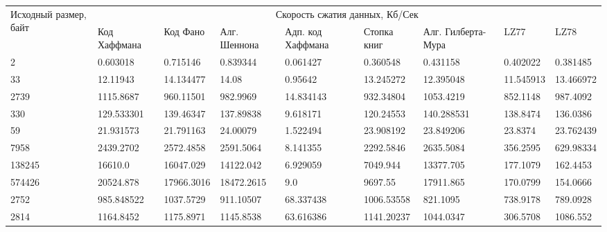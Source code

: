 \documentclass[a4paper,oneside]{article}
\theoremstyle{definition}
\begin{document}
\begin{table}[H]
  \small
  \centering
  \begin{tabular}{|p{1.5cm}|p{1.5cm}|p{1.5cm}|p{1.5cm}|p{1.5cm}|p{1.5cm}|p{1.5cm}|p{1.5cm}|p{1.5cm}|}
    \hline
    \multirow{2}{1.5cm}{Исходный размер, байт} & \multicolumn{8}{c|}{Скорость сжатия данных, Кб/Сек} \\ \cline{2-9}
    & Код Хаффмана & Код Фано & Алг. Шеннона & Адп. код Хаффмана &
    Стопка книг & Алг. Гилберта-Мура & LZ77 & LZ78 \\ \hline \hline

    2      & 0.603018 & 0.715146 & 0.839344 & 0.061427 & 0.360548 & 0.431158 & 0.402022 & 0.381485 \\ \hline
    33     & 12.11943 & 14.134477 & 14.08 & 0.95642 & 13.245272 & 12.395048 & 11.545913 & 13.466972 \\ \hline
    2739   & 1115.8687 & 960.11501 & 982.9969 & 14.834143 & 932.34804 & 1053.4219 & 852.1148 & 987.4092 \\ \hline
    330    & 129.533301 & 139.46347 & 137.89838 & 9.618171 & 120.24553 & 140.288531 & 138.8474 & 136.0386 \\ \hline
    59     & 21.931573 & 21.791163 & 24.00079 & 1.522494 & 23.908192 & 23.849206 & 23.8374 & 23.762439 \\ \hline
    7958   & 2439.2702 & 2572.4858 & 2591.5064 & 8.141355 & 2292.5846 & 2635.5084 & 356.2595 & 629.98334 \\ \hline
    138245 & 16610.0 & 16047.029 & 14122.042 & 6.929059 & 7049.944 & 13377.705 & 177.1079 & 162.4453 \\ \hline
    574426 & 20524.878 & 17966.3016 & 18472.2615 & 9.0 & 9697.55 & 17911.865 & 170.0799 & 154.0666 \\ \hline
    2752   & 985.848522 & 1037.5729 & 911.10507 & 68.337438 & 1006.53558 & 821.1095 & 738.9178 & 789.0928 \\ \hline
    2814   & 1164.8452 & 1175.8971 & 1145.8538 & 63.616386 & 1141.20237 & 1044.0347 & 306.5708 & 1086.552 \\ \hline
  \end{tabular}
\end{table}
\end{document}
